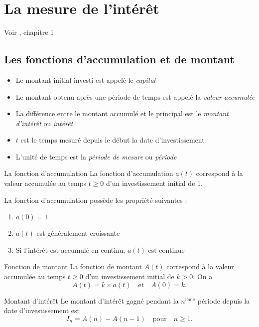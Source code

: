 \chapter{La mesure de l'intérêt}
Voir \cite{kellison2006theory}, chapitre 1
\section{Les fonctions d'accumulation et de montant}

\begin{itemize}
	\item Le montant initial investi est appelé le \textit{capital}
	\item Le montant obtenu après une période de temps est appelé la \textit{valeur accumulée}
	\item La différence entre le montant accumulé et le principal est le \textit{montant d'intérêt} ou \textit{intérêt}
	\item $t$ est le temps mesuré depuis le début la date d'investissement
	\item L'unité de temps est la \textit{période de mesure} ou \textit{période}
\end{itemize}

\begin{definition}{La fonction d'accumulation}{}
	La fonction d'accumulation $a(t)$ correspond à la valeur accumulée au temps $t\geq 0$ d'un investissement initial de $1$. 
\end{definition}

La fonction d'accumulation possède les propriété suivantes : 
\begin{enumerate}
	\item $a(0) = 1$
	\item $a(t)$ est généralement croissante
	\item Si l'intérêt est accumulé en continu, $a(t)$ est continue
\end{enumerate}

\begin{definition}{Fonction de montant}{}
	La fonction de montant $A(t)$ correspond à la valeur accumulée au temps $t\geq 0$ d'un investissement initial de $k>0$. On a 
	$$A(t) = k \times a(t) \quad \text{et} \quad A(0) = k.$$
\end{definition}

\begin{definition}{Montant d'intérêt}{}
	Le montant d'intérêt gagné pendant la $n^{\text{ième}}$ période depuis la date d'investissement est $$I_n = A(n) - A(n-1) \quad \text{pour} \quad n\geq 1.$$
\end{definition}

